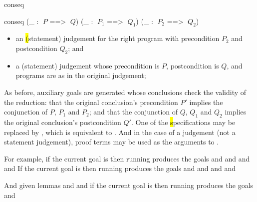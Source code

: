 \begin{tactic}{conseq}
\begin{tsyntax}{conseq (_ : $\;P$ ==> $\;Q$) (_ : $\;P_1$ ==>
      $\;Q_1$) (_ : $\;P_2$ ==> $\;Q_2$)}
\begin{itemize}
    \item an \hl (statement) judgement for the right program with
      precondition $P_2$ and postcondition $Q_2$; and

    \item a \prhl (statement) judgement whose precondition is $P$,
      postcondition is $Q$, and programs are as in the original
      judgement;

    \end{itemize}
    As before, auxiliary goals are generated whose conclusions
    check the validity of the reduction: that the original
    conclusion's precondition $P'$ implies the conjunction of
    $P$, $P_1$ and $P_2$; and that the conjunction of
    $Q$, $Q_1$ and $Q_2$ implies the original conclusion's
    postcondition $Q'$. One of the \hl specifications may be
    replaced by \ec{_}, which is equivalent to
    . And in the case of
    a \prhl judgement (not a statement judgement), proof
    terms may be used as the arguments to .

    \medskip For example, if the current goal is
     then
    running 
    produces the goals
    and
    and
    and
    and
    If the current goal is
     then
    running 
    produces the goals
    and
    and
    and
    and

    And given lemmas
    and
    and
    if the current goal is
     then
    running 
    produces the goals
    and
  \end{tsyntax}
\end{tactic}

